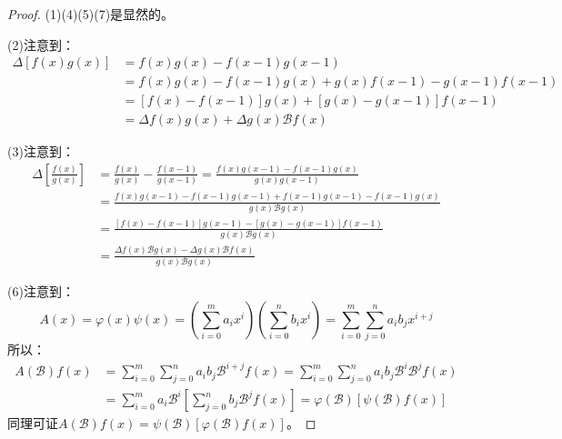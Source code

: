\begin{proof}
	(1)(4)(5)(7)是显然的。\par
	(2)注意到：
	\begin{align*}
		\Delta[f(x)g(x)]&=f(x)g(x)-f(x-1)g(x-1) \\
		&=f(x)g(x)-f(x-1)g(x)+g(x)f(x-1)-g(x-1)f(x-1) \\
		&=[f(x)-f(x-1)]g(x)+[g(x)-g(x-1)]f(x-1) \\
		&=\Delta f(x)g(x)+\Delta g(x)\mathcal{B}f(x)
	\end{align*}\par
	(3)注意到：
	\begin{align*}
		\Delta\left[\frac{f(x)}{g(x)}\right]
		&=\frac{f(x)}{g(x)}-\frac{f(x-1)}{g(x-1)}
		=\frac{f(x)g(x-1)-f(x-1)g(x)}{g(x)g(x-1)} \\
		&=\frac{f(x)g(x-1)-f(x-1)g(x-1)+f(x-1)g(x-1)-f(x-1)g(x)}{g(x)\mathcal{B}g(x)} \\
		&=\frac{[f(x)-f(x-1)]g(x-1)-[g(x)-g(x-1)]f(x-1)}{g(x)\mathcal{B}g(x)} \\
		&=\frac{\Delta f(x)\mathcal{B}g(x)-\Delta g(x)\mathcal{B}f(x)}{g(x)\mathcal{B}g(x)}
	\end{align*}\par
	(6)注意到：
	\begin{equation*}
		A(x)=\varphi(x)\psi(x)=\left(\sum_{i=0}^{m}a_ix^i\right)\left(\sum_{i=0}^{n}b_ix^i\right)=\sum_{i=0}^{m}\sum_{j=0}^{n}a_ib_j x^{i+j}
	\end{equation*}
	所以：
	\begin{align*}
		A(\mathcal{B})f(x)&=\sum_{i=0}^{m}\sum_{j=0}^{n}a_ib_j\mathcal{B}^{i+j}f(x)
		=\sum_{i=0}^{m}\sum_{j=0}^{n}a_ib_j \mathcal{B}^i\mathcal{B}^j f(x) \\
		&=\sum_{i=0}^{m}a_i\mathcal{B}^i\left[\sum_{j=0}^{n}b_j\mathcal{B}^j f(x)\right]
		=\varphi(\mathcal{B})[\psi(\mathcal{B})f(x)]
	\end{align*}
	同理可证$A(\mathcal{B})f(x)=\psi(\mathcal{B})[\varphi(\mathcal{B})f(x)]$。
\end{proof}


